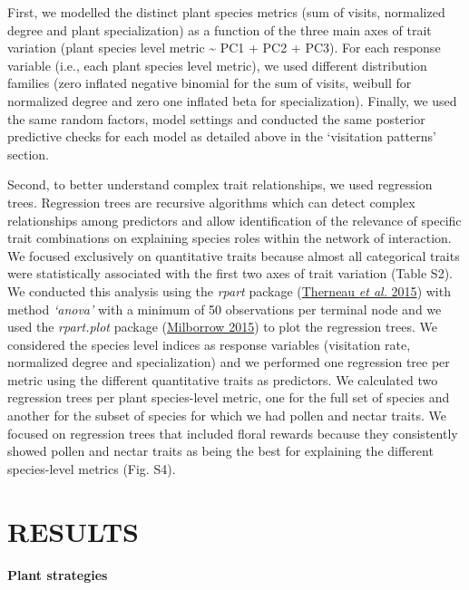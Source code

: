 \documentclass[
  12pt,
  a4paper,
]{article}
\begin{document}
First, we modelled the distinct plant species metrics (sum of visits, normalized degree and plant specialization) as a function of the three main axes of trait variation (plant species level metric \textasciitilde{} PC1 + PC2 + PC3). For each response variable (i.e., each plant species level metric), we used different distribution families (zero inflated negative binomial for the sum of visits, weibull for normalized degree and zero one inflated beta for specialization). Finally, we used the same random factors, model settings and conducted the same posterior predictive checks for each model as detailed above in the `visitation patterns' section.

Second, to better understand complex trait relationships, we used regression trees. Regression trees are recursive algorithms which can detect complex relationships among predictors and allow identification of the relevance of specific trait combinations on explaining species roles within the network of interaction. We focused exclusively on quantitative traits because almost all categorical traits were statistically associated with the first two axes of trait variation (Table S2). We conducted this analysis using the \emph{rpart} package (\protect\hyperlink{ref-therneau2015}{Therneau \emph{et al.} 2015}) with method \emph{`anova'} with a minimum of 50 observations per terminal node and we used the \emph{rpart.plot} package (\protect\hyperlink{ref-milborrow2015}{Milborrow 2015}) to plot the regression trees. We considered the species level indices as response variables (visitation rate, normalized degree and specialization) and we performed one regression tree per metric using the different quantitative traits as predictors. We calculated two regression trees per plant species-level metric, one for the full set of species and another for the subset of species for which we had pollen and nectar traits. We focused on regression trees that included floral rewards because they consistently showed pollen and nectar traits as being the best for explaining the different species-level metrics (Fig. S4).

\hypertarget{results}{%
\section{RESULTS}\label{results}}

\textbf{Plant strategies}
\end{document}
